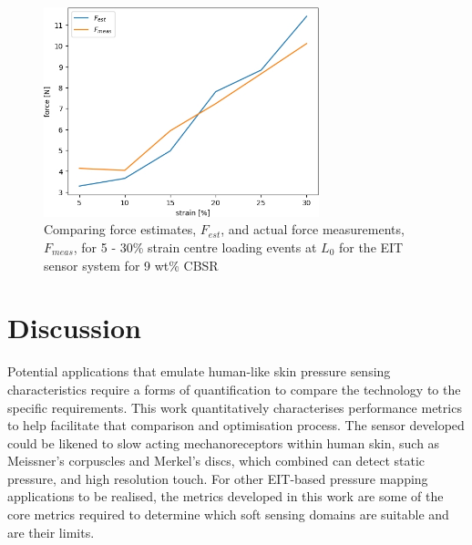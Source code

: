\begin{figure}[H]
    \centering
    \includegraphics[width=8cm]{Figures/CBSR_9p_2_9push_XXstrain_60s_1mA_3_force_est_frame31.jpg}
    \caption{Comparing force estimates, $F_{est}$, and actual force measurements, $F_{meas}$, for 5 - 30\% strain centre loading events at $L_0$ for the EIT sensor system for 9 wt\% CBSR}
    \label{fig:stress_est_9p_3}
\end{figure}


\section{Discussion}\label{sec:Discussion}
Potential applications that emulate human-like skin pressure sensing characteristics require a forms of quantification to compare the technology to the specific requirements. This work quantitatively characterises performance metrics to help facilitate that comparison and optimisation process. The sensor developed could be likened to slow acting mechanoreceptors within human skin, such as Meissner's corpuscles and Merkel's discs, which combined can detect static pressure, and high resolution touch. For other EIT-based pressure mapping applications to be realised, the metrics developed in this work are some of the core metrics required to determine which soft sensing domains are suitable and are their limits.

